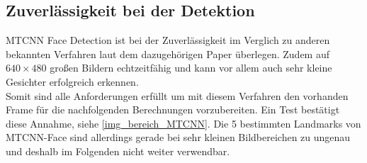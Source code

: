 \subsection{Zuverlässigkeit bei der Detektion}
MTCNN Face Detection ist bei der Zuverlässigkeit im Verglich zu anderen bekannten Verfahren laut dem dazugehörigen Paper \cite{MTCCN} überlegen. Zudem auf $640\times 480$ großen Bildern echtzeitfähig und kann vor allem auch sehr kleine Gesichter erfolgreich erkennen.\\
Somit sind alle Anforderungen erfüllt um mit diesem Verfahren den vorhanden Frame für die nachfolgenden Berechnungen vorzubereiten. Ein Test bestätigt diese Annahme, siehe \autoref{img_bereich_MTCNN}.
Die 5 bestimmten Landmarks von MTCNN-Face sind allerdings gerade bei sehr kleinen Bildbereichen zu ungenau und deshalb im Folgenden nicht weiter verwendbar.
